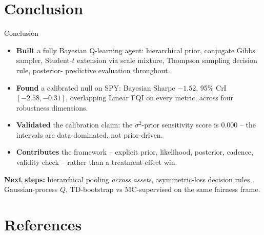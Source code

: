 \documentclass[10pt,aspectratio=169]{beamer}
\begin{document}
\section{Conclusion}

\begin{frame}{Conclusion}
\begin{itemize}
  \item \textbf{Built} a fully Bayesian Q-learning agent: hierarchical
        prior, conjugate Gibbs sampler, Student-$t$ extension via
        scale mixture, Thompson sampling decision rule, posterior-
        predictive evaluation throughout.
  \item \textbf{Found} a calibrated null on SPY: Bayesian Sharpe
        $-1.52$, 95\% CrI $[-2.58, -0.31]$, overlapping Linear FQI on
        every metric, across four robustness dimensions.
  \item \textbf{Validated} the calibration claim: the
        $\sigma^2$-prior sensitivity score is $0.000$ -- the
        intervals are data-dominated, not prior-driven.
  \item \textbf{Contributes} the framework -- explicit prior,
        likelihood, posterior, cadence, validity check -- rather than
        a treatment-effect win.
\end{itemize}

\bigskip
\textbf{Next steps:} hierarchical pooling \emph{across assets},
asymmetric-loss decision rules, Gaussian-process $Q$, TD-bootstrap
vs MC-supervised on the same fairness frame.
\end{frame}

\section*{References}
\end{document}
